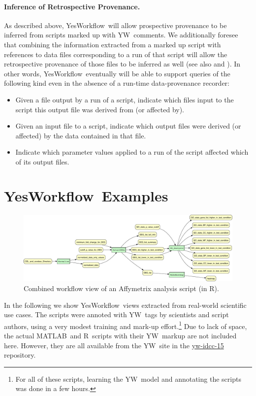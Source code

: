 \documentclass{article}
\newcommand{\YW}{\textsf{YesWorkflow}}
\newcommand{\yw}{\textsf{YW}}
\newcommand{\YWT}{\textsf{YesWorkflow}}
\newcommand{\R}{\textsf{R}}
\newcommand{\MATLAB}{\textsf{MATLAB}}
\begin{document}
\paragraph{Inference of Retrospective Provenance.}
As described above, \YW\ will allow prospective provenance to be
inferred from scripts marked up with \yw\ comments.  We additionally
foresee that combining the information extracted from a marked up
script with references to data files corresponding to a run of that
script will allow the retrospective provenance of those files to be
inferred as well (see also \cite{Bowers2012Provenance} and
\cite{Zinn2010Abstract}). In other words, \YW\ eventually will be able
to support queries of the following kind even in the absence of a
run-time data-provenance recorder:
\begin{itemize} 
\item Given a file output by a run of a script, indicate which files
  input to the script this output file was derived  from (or affected
  by). 
\item Given an input file to a script, indicate which  output files
  were derived (or affected) by the data contained in that file.
\item Indicate which parameter values applied to a run of the
  script affected which of its output files. 
\end{itemize}



\section{\YWT\ Examples}

 \begin{figure}[t]
   \centering
   \includegraphics[width=.99\textwidth]{figures/Affymetrix_combined-crop.pdf}
   \caption{Combined workflow view of an
     Affymetrix analysis script (in \R).}
   \label{fig-affymetrics}
 \end{figure}

 In the following we show \YW\ views extracted from real-world
 scientific use cases.  The scripts were annoted with \yw\ tags by
 scientists and script authors, using a very modest training and
 mark-up effort.\footnote{For all of these scripts, learning the \yw\
   model and annotating the scripts was done in a few hours.}  Due to
 lack of space, the actual \MATLAB\ and \R\ scripts with their \yw\
 markup are not included here. However, they are all available from
 the \yw\ site \cite{YWgithub2015} in the
 \href{https://github.com/yesworkflow-org/yw-idcc-15}{yw-idcc-15}
 repository. 
\end{document}

